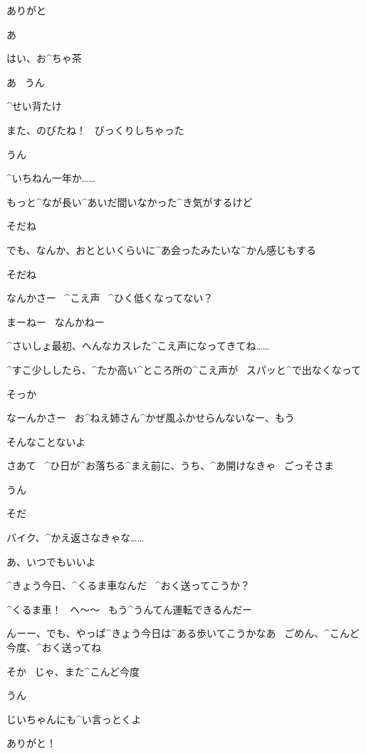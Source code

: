 \Alpha ありがと

\page[21]
\Takahiro あ

\Takahiro はい、お^{ちゃ}{茶}

\Alpha あ
\ うん

\Alpha ^{せい}{背}たけ

\Alpha また、のびたね！
\ びっくりしちゃった

\Takahiro うん

\page[22]
\Takahiro ^{いちねん}{一年}か……

\Takahiro もっと^{なが}{長}い^{あいだ}{間}いなかった^{き}{気}がするけど

\Alpha そだね

\Takahiro でも、なんか、おとといくらいに^{あ}{会}ったみたいな^{かん}{感}じもする

\Alpha そだね

\Alpha なんかさー
\ ^{こえ}{声}
\ ^{ひく}{低}くなってない？

\Takahiro まーねー
\ なんかねー

\page[23]
\Takahiro ^{さいしょ}{最初}、へんなカスレた^{こえ}{声}になってきてね……

\Takahiro ^{すこ}{少}ししたら、^{たか}{高}い^{ところ}{所}の^{こえ}{声}が
\ スパッと^{で}{出}なくなって

\Alpha そっか

\Alpha なーんかさー
\ お^{ねえ}{姉}さん^{かぜ}{風}ふかせらんないなー、もう

\Takahiro そんなことないよ

\page[25]
\Alpha さあて
\ ^{ひ}{日}が^{お}{落}ちる^{まえ}{前}に、うち、^{あ}{開}けなきゃ
\ ごっそさま

\Takahiro うん

\Takahiro そだ

\Takahiro バイク、^{かえ}{返}さなきゃな……

\Alpha あ、いつでもいいよ

\Takahiro ^{きょう}{今日}、^{くるま}{車}なんだ
\ ^{おく}{送}ってこうか？

\Alpha ^{くるま}{車}！
\ へ〜〜
\ もう^{うんてん}{運転}できるんだー

\page[26]
\Alpha んーー、でも、やっぱ^{きょう}{今日}は^{ある}{歩}いてこうかなあ
\ ごめん、^{こんど}{今度}、^{おく}{送}ってね

\Takahiro そか
\ じゃ、また^{こんど}{今度}

\Alpha うん

\page[27]
\Takahiro じいちゃんにも^{い}{言}っとくよ

\Alpha ありがと！



